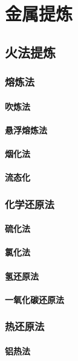 \documentclass[UTF8]{../../ApplicationUniverse}
\begin{document}
\section{金属提炼}
    \subsection{火法提炼}
        \subsubsection{熔炼法}
            \paragraph{吹炼法}
            \paragraph{悬浮熔炼法}
            \paragraph{烟化法}
            \paragraph{流态化}
        \subsubsection{化学还原法}
            \paragraph{硫化法}
            \paragraph{氯化法}
            \paragraph{氢还原法}
            \paragraph{一氧化碳还原法}
        \subsubsection{热还原法}
            \paragraph{铝热法}
\end{document}
